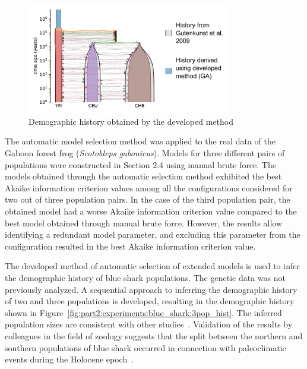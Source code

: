 \begin{figure}[t]
    \centering
        \includegraphics[width=0.8\textwidth]{images_experiments/3pop_human_gutenkunst/picture_3pop_result_en.pdf}
    \caption{Demographic history obtained by the developed method}
\end{figure}

The automatic model selection method was applied to the real data of the Gaboon forest frog (\textit{Scotobleps gabonicus}).
Models for three different pairs of populations were constructed in Section 2.4 using manual brute force.
The models obtained through the automatic selection method exhibited the best Akaike information criterion values among all the configurations considered for two out of three population pairs.
In the case of the third population pair, the obtained model had a worse Akaike information criterion value compared to the best model obtained through manual brute force.
However, the results allow identifying a redundant model parameter, and excluding this parameter from the configuration resulted in the best Akaike information criterion value.

The developed method of automatic selection of extended models is used to infer the demographic history of blue shark populations.
The genetic data was not previously analyzed.
A sequential approach to inferring the demographic history of two and three populations is developed, resulting in the demographic history shown in Figure~\ref{fig:part2:experiments:blue_shark:3pop_hist}.
The inferred population sizes are consistent with other studies~\cite{king2015genetic,verissimo2017world}.
Validation of the results by colleagues in the field of zoology suggests that the split between the northern and southern populations of blue shark occurred in connection with paleoclimatic events during the Holocene epoch~\cite{leduc2010holocene,masson2013information,olsen2012variability}.

